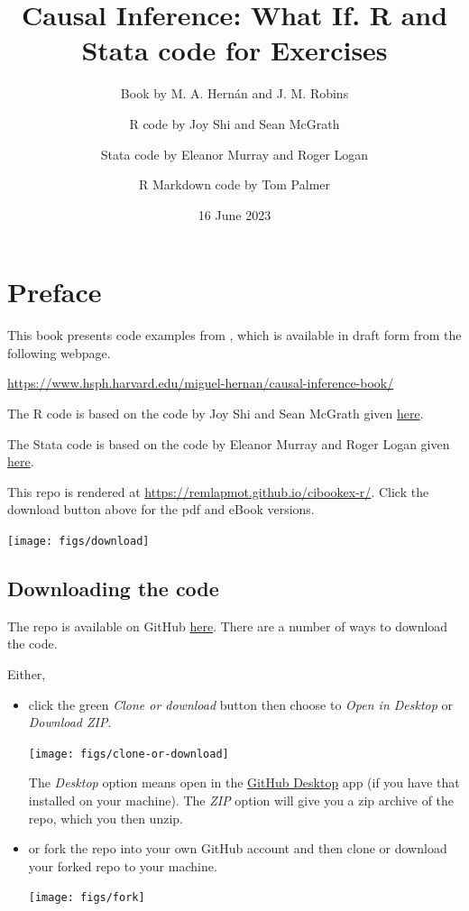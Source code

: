 \documentclass[
  10pt,
  a4paper,
]{book}
\title{Causal Inference: What If. R and Stata code for Exercises}
\author{Book by M. A. Hernán and J. M. Robins \and R code by Joy Shi and Sean McGrath \and Stata code by Eleanor Murray and Roger Logan \and R Markdown code by Tom Palmer}
\date{16 June 2023}
\begin{document}
\maketitle

\thispagestyle{empty}

{
\hypersetup{linkcolor=}
\setcounter{tocdepth}{1}
\tableofcontents
}
\hypertarget{preface}{%
\chapter*{Preface}\label{preface}}

This book presents code examples from \citet{ci-book}, which is available in draft form from the following webpage.

\url{https://www.hsph.harvard.edu/miguel-hernan/causal-inference-book/}

The R code is based on the code by Joy Shi and Sean McGrath given \href{https://cdn1.sph.harvard.edu/wp-content/uploads/sites/1268/1268/20/Rcode_CIpart2.zip}{here}.

The Stata code is based on the code by Eleanor Murray and Roger Logan given \href{https://cdn1.sph.harvard.edu/wp-content/uploads/sites/1268/2019/11/stata_part2.zip}{here}.

This repo is rendered at \url{https://remlapmot.github.io/cibookex-r/}. Click the download button above for the pdf and eBook versions.

\begin{center}\texttt{[image: figs/download]} \end{center}

\hypertarget{downloading-the-code}{%
\section{Downloading the code}\label{downloading-the-code}}

The repo is available on GitHub \href{https://github.com/remlapmot/cibookex-r}{here}. There are a number of ways to download the code.

Either,

\begin{itemize}
\item
  click the green \emph{Clone or download} button then choose to \emph{Open in Desktop} or \emph{Download ZIP}.

  \begin{center}\texttt{[image: figs/clone-or-download]} \end{center}

  The \emph{Desktop} option means open in the \href{https://desktop.github.com/}{GitHub Desktop} app (if you have that installed on your machine). The \emph{ZIP} option will give you a zip archive of the repo, which you then unzip.
\item
  or fork the repo into your own GitHub account and then clone or download your forked repo to your machine.

  \begin{center}\texttt{[image: figs/fork]} \end{center}
\end{itemize}
\end{document}
